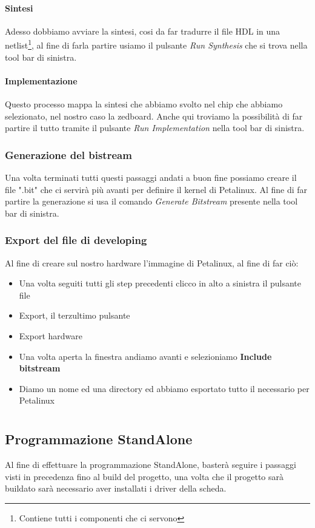 \subsubsection{Sintesi}
Adesso dobbiamo avviare la sintesi, cosi da far tradurre il file HDL in una netlist\footnote{Contiene tutti i componenti che ci servono}, al fine di farla partire usiamo il pulsante \textit{Run Synthesis} che si trova nella tool bar di sinistra.
\subsubsection{Implementazione}
Questo processo mappa la sintesi che abbiamo svolto nel chip che abbiamo selezionato, nel nostro caso la zedboard. Anche qui troviamo la possibilità di far partire il tutto tramite il pulsante \textit{Run Implementation} nella tool bar di sinistra.
\subsection{Generazione del bistream}
Una volta terminati tutti questi passaggi andati a buon fine possiamo creare il file ".bit" che ci servirà più avanti per definire il kernel di Petalinux. Al fine di far partire la generazione si usa il comando \textit{Generate Bitstream} presente nella tool bar di sinistra.
\subsection{Export del file di developing}\label{ExportVivado}
Al fine di creare sul nostro hardware l'immagine di Petalinux, al fine di far ciò:
\begin{itemize}
\item Una volta seguiti tutti gli step precedenti clicco in alto a sinistra il pulsante file
\item Export, il terzultimo pulsante
\item Export hardware
\item Una volta aperta la finestra andiamo avanti e selezioniamo \textbf{Include bitstream}
\item Diamo un nome ed una directory ed abbiamo esportato tutto il necessario per Petalinux
\end{itemize}


\chapter{}

\section{Programmazione StandAlone}
\label{Standalone}
Al fine di effettuare la programmazione StandAlone, basterà seguire i passaggi visti in precedenza fino al build del progetto, una volta che il progetto sarà buildato sarà necessario aver installati i driver della scheda.
